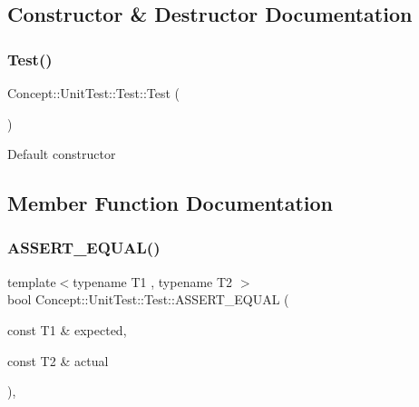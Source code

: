 \subsection{Constructor \& Destructor Documentation}
\mbox{\label{class_concept_1_1_unit_test_1_1_test_a29ca1a5654e3fe0a8911a21a5c2e0dce}} 
\subsubsection{\texorpdfstring{Test()}{Test()}}
{\footnotesize\ttfamily Concept\+::\+Unit\+Test\+::\+Test\+::\+Test (\begin{DoxyParamCaption}{ }\end{DoxyParamCaption})\hspace{0.3cm}{\ttfamily [inline]}}

Default constructor 

\subsection{Member Function Documentation}
\mbox{\label{class_concept_1_1_unit_test_1_1_test_ab12b779095f2e0a9322c8bffa2c8941b}} 
\subsubsection{\texorpdfstring{ASSERT\_EQUAL()}{ASSERT\_EQUAL()}}
{\footnotesize\ttfamily template$<$typename T1 , typename T2 $>$ \\
bool Concept\+::\+Unit\+Test\+::\+Test\+::\+A\+S\+S\+E\+R\+T\+\_\+\+E\+Q\+U\+AL (\begin{DoxyParamCaption}\item[{const T1 \&}]{expected,  }\item[{const T2 \&}]{actual }\end{DoxyParamCaption})\hspace{0.3cm}{\ttfamily [inline]}, {\ttfamily [protected]}}

